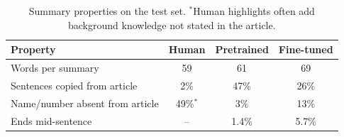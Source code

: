 \documentclass[conference]{IEEEtran}
\begin{document}
\begin{table}[t]
\caption{Summary properties on the test set. $^{*}$Human highlights often add background knowledge not stated in the article.}
\label{tab:behaviour}
\centering
\begin{tabular}{lccc}
\toprule
Property & Human & Pretrained & Fine-tuned \\
\midrule
Words per summary                & 59 & 61 & 69 \\
Sentences copied from article    & 2\% & 47\% & 26\% \\
Name/number absent from article  & 49\%$^{*}$ & 3\% & 13\% \\
Ends mid-sentence                & -- & 1.4\% & 5.7\% \\
\bottomrule
\end{tabular}
\end{table}

\begin{table}[t]
\caption{Test ROUGE F1 (\%) by input, 418 stories. Same training and decoding for every row. Each block is one run with its own article-only baseline; $\Delta$ = R-2 gain over that baseline; $p$ = paired bootstrap probability of beating it (R-2).}
\label{tab:mm}
\centering
\setlength{\tabcolsep}{3pt}
\end{table}
\end{document}
